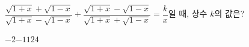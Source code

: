 \hspace*{2mm}\begin{minipage}[t]{\dimexpr\linewidth-2mm\relax}\vspace{0pt}
$\dfrac{\sqrt{1+x}+\sqrt{1-x}}{\sqrt{1+x}-\sqrt{1-x}}+\dfrac{\sqrt{1+x}-\sqrt{1-x}}{\sqrt{1+x}+\sqrt{1-x}}=\dfrac{k}{x}$일 때, 상수 $k$의 값은?
\begin{choices32}{$-2$}{$-1$}{$1$}{$2$}{$4$}\end{choices32}\end{minipage}
